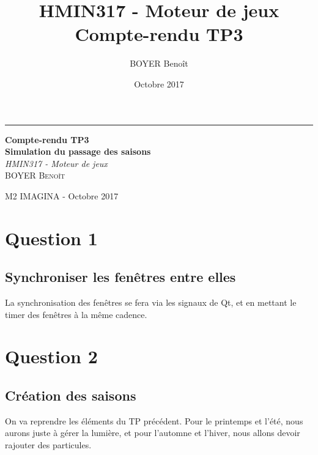 \documentclass[a4paper,11pt]{report}
\title{HMIN317 - Moteur de jeux \\ Compte-rendu TP3}
\author{BOYER Benoît}
\date{Octobre 2017}
\begin{document}
  	  \begin{titlepage} %
	
	  \raggedleft %
	
	  \rule{1pt}{\textheight} %
	  \hspace{0.05\textwidth} %
	  \parbox[b]{0.75\textwidth}{ %
		
		  {\Huge\bfseries Compte-rendu TP3 \\[0.5\baselineskip] Simulation du passage des saisons}\\[2\baselineskip] %
		  {\large\textit{HMIN317 - Moteur de jeux}}\\[4\baselineskip] %
		  {\Large\textsc{BOYER Benoît}} %
		
		  \vspace{0.5\textheight} %
		
		  {\noindent M2 IMAGINA - Octobre 2017}\\[\baselineskip] %
	  }

  \end{titlepage}
  
    \tableofcontents
	\pagebreak


    \section{Question 1}
    \subsection{Synchroniser les fenêtres entre elles}
	La synchronisation des fenêtres se fera via les signaux de Qt, et en mettant le timer des fenêtres à la même cadence.

	\section{Question 2}
	\subsection{Création des saisons}
	On va reprendre les éléments du TP précédent. Pour le printemps et l'été, nous aurons juste à gérer la lumière, et pour l'automne et l'hiver, nous allons devoir rajouter des particules.
\end{document}

